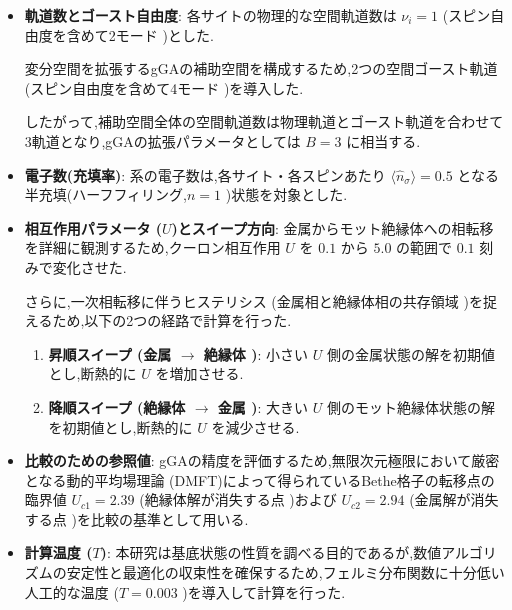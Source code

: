 \begin{itemize}
    \item \textbf{軌道数とゴースト自由度}: 
    各サイトの物理的な空間軌道数は $\nu_i = 1$ (スピン自由度を含めて2モード )とした.
    
    変分空間を拡張するgGAの補助空間を構成するため,2つの空間ゴースト軌道 (スピン自由度を含めて4モード )を導入した.
    
    したがって,補助空間全体の空間軌道数は物理軌道とゴースト軌道を合わせて3軌道となり,gGAの拡張パラメータとしては $B=3$ に相当する.
    
    \item \textbf{電子数(充填率)}:
    系の電子数は,各サイト・各スピンあたり $\langle \hat{n}_\sigma \rangle = 0.5$ となる半充填(ハーフフィリング,$n=1$ )状態を対象とした.
    
    \item \textbf{相互作用パラメータ ($U$)とスイープ方向}: 
    金属からモット絶縁体への相転移を詳細に観測するため,クーロン相互作用 $U$ を $0.1$ から $5.0$ の範囲で $0.1$ 刻みで変化させた.
    
    さらに,一次相転移に伴うヒステリシス (金属相と絶縁体相の共存領域 )を捉えるため,以下の2つの経路で計算を行った.
    \begin{enumerate}
        \item \textbf{昇順スイープ (金属 $\to$ 絶縁体 )}: 小さい $U$ 側の金属状態の解を初期値とし,断熱的に $U$ を増加させる.
        \item \textbf{降順スイープ (絶縁体 $\to$ 金属 )}: 大きい $U$ 側のモット絶縁体状態の解を初期値とし,断熱的に $U$ を減少させる.
    \end{enumerate}
    
    \item \textbf{比較のための参照値}:
    gGAの精度を評価するため,無限次元極限において厳密となる動的平均場理論 (DMFT)によって得られているBethe格子の転移点の臨界値 $U_{c1} = 2.39$ (絶縁体解が消失する点 )および $U_{c2} = 2.94$ (金属解が消失する点 )を比較の基準として用いる.
    
    \item \textbf{計算温度 ($T$)}:
    本研究は基底状態の性質を調べる目的であるが,数値アルゴリズムの安定性と最適化の収束性を確保するため,フェルミ分布関数に十分低い人工的な温度 ($T = 0.003$ )を導入して計算を行った.
\end{itemize}